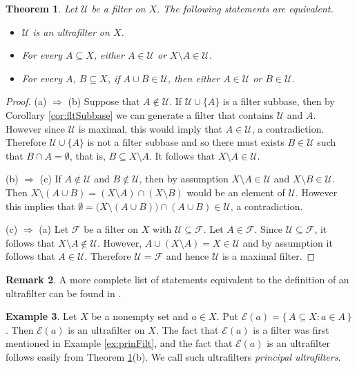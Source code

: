 \documentclass[12pt]{article}
\theoremstyle{plain}
\newtheorem{thm}{Theorem}[section]
\theoremstyle{definition}
\newtheorem{rmk}[thm]{Remark}
\newtheorem{example}[thm]{Example}
\newcommand{\calE}{\mathcal{E}}
\newcommand{\calF}{\mathcal{F}}
\newcommand{\calU}{\mathcal{U}}
\begin{document}
\begin{thm}
  \label{thm:equivUf}
  Let $\calU$ be a filter on $X$.
  The following statements are equivalent.
  \begin{itemize}
    \item[(a)] $\calU$ is an ultrafilter on $X$.
    \item[(b)] For every $A \subseteq X$, either $A \in \calU$ or $X \setminus A \in \calU$.
    \item[(c)] For every $A$, $B \subseteq X$, if $A \cup B \in \calU$, then either $A \in \calU$ or $B \in \calU$.
  \end{itemize}
\end{thm}
\begin{proof}
  (a) $\Rightarrow$ (b)
  Suppose that $A \not\in \calU$.
  If $\calU \cup \{A\}$ is a filter subbase, then by Corollary
  \ref{cor:fltSubbase} we can generate a filter that contains $\calU$
  and $A$.
  However since $\calU$ is maximal, this would imply that $A \in
  \calU$, a contradiction.
  Therefore $\calU \cup \{A\}$ is not a filter subbase and so there
  must exists $B \in \calU$ such that $B \cap A = \emptyset$, that is,
  $B \subseteq X \setminus A$.
  It follows that $X \setminus A \in \calU$.
  
  (b) $\Rightarrow$ (c)
  If $A \not\in \calU$ and $B \not\in \calU$, then by assumption $X
  \setminus A \in \calU$ and $X \setminus B \in \calU$.
  Then $X \setminus (A \cup B) = (X \setminus A) \cap (X \setminus B)$
  would be an element of $\calU$.
  However this implies that $\emptyset = \bigl(X \setminus (A \cup
  B)\bigr) \cap (A \cup B) \in \calU$, a contradiction.

  (c) $\Rightarrow$ (a)
  Let $\calF$ be a filter on $X$ with $\calU \subseteq \calF$.
  Let $A \in \calF$.
  Since $\calU \subseteq \calF$, it follows that $X \setminus A
  \not\in \calU$.
  However, $A \cup (X \setminus A) = X \in \calU$ and by assumption it
  follows that $A \in \calU$.
  Therefore $\calU = \calF$ and hence $\calU$ is a maximal filter.
\end{proof}
\begin{rmk}
  A more complete list of statements equivalent to the definition of an ultrafilter can be found in \cite[Theorem 3.6]{Hindman:1998fk}.
\end{rmk}

\begin{example}
  Let $X$ be a nonempty set and $a \in X$.
  Put $\calE(a) = \{\, A \subseteq X : a \in A \,\}$.
  Then $\calE(a)$ is an ultrafilter on $X$.
  The fact that $\calE(a)$ is a filter was first mentioned in Example  \ref{ex:prinFilt}, and the fact that $\calE(a)$ is an ultrafilter
  follows easily from Theorem \ref{thm:equivUf}(b).
  We call such ultrafilters \textsl{principal ultrafilters}.
\end{example}
\end{document}
